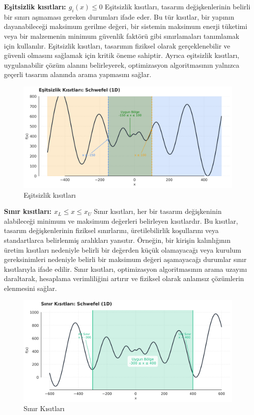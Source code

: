 \textbf{Eşitsizlik kısıtları: $g_i(x) \leq 0$}
Eşitsizlik kısıtları, tasarım değişkenlerinin belirli bir sınırı aşmaması gereken durumları ifade eder. Bu tür kısıtlar, bir yapının dayanabileceği maksimum gerilme değeri, bir sistemin maksimum enerji tüketimi veya bir malzemenin minimum güvenlik faktörü gibi sınırlamaları tanımlamak için kullanılır. Eşitsizlik kısıtları, tasarımın fiziksel olarak gerçeklenebilir ve güvenli olmasını sağlamak için kritik öneme sahiptir. Ayrıca eşitsizlik kısıtları, uygulanabilir çözüm alanını belirleyerek, optimizasyon algoritmasının yalnızca geçerli tasarım alanında arama yapmasını sağlar.

\begin{figure}[H]
    \centering
    \includegraphics[width=1\textwidth]{weeks_new/imgs/inequality_constraints.png}
    \caption{Eşitsizlik kısıtları}
    \label{fig:}
\end{figure}


\textbf{Sınır kısıtları: $x_L \leq x \leq x_U$}
Sınır kısıtları, her bir tasarım değişkeninin alabileceği minimum ve maksimum değerleri belirleyen kısıtlardır. Bu kısıtlar, tasarım değişkenlerinin fiziksel sınırlarını, üretilebilirlik koşullarını veya standartlarca belirlenmiş aralıkları yansıtır. Örneğin, bir kirişin kalınlığının üretim kısıtları nedeniyle belirli bir değerden küçük olamayacağı veya kurulum gereksinimleri nedeniyle belirli bir maksimum değeri aşamayacağı durumlar sınır kısıtlarıyla ifade edilir. Sınır kısıtları, optimizasyon algoritmasının arama uzayını daraltarak, hesaplama verimliliğini artırır ve fiziksel olarak anlamsız çözümlerin elenmesini sağlar.

\begin{figure}[H]
    \centering
    \includegraphics[width=1\textwidth]{weeks_new/imgs/boundary_constraints.png}
    \caption{Sınır Kısıtları}
    \label{fig:}
\end{figure}

